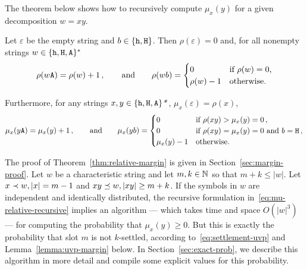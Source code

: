 
The theorem below shows how to recursively compute $\mu_x(y)$ 
for a given decomposition $w = xy$.


\begin{theorem}\label{thm:relative-margin}
  Let $\varepsilon$ be the empty string 
  and $b \in \{\mathtt{h}, \mathtt{H}\}$. 
  Then $\rho(\varepsilon) = 0$ 
  and, for all nonempty strings $w \in \{\mathtt{h}, \mathtt{H}, \mathtt{A}\}^*$ 
  \begin{equation}
    \rho(w\mathtt{A}) = \rho(w) + 1\,, \qquad\text{and}\qquad
    \rho(wb) = \begin{cases} 0 & \text{if $\rho(w) = 0$,}\\
      \rho(w)-1 & \text{otherwise.}
    \end{cases}
    \label{eq:rho-recursive}
  \end{equation}


  Furthermore, for any strings $x, y \in\{\mathtt{h}, \mathtt{H}, \mathtt{A}\}\text{\emph{*}}$,
  $\mu_x(\varepsilon) =\rho(x)$, 
  \begin{equation}
    \mu_x(y\mathtt{A})= \mu_x(y)+1\,,\qquad\text{and}\qquad
    \mu_x(yb)= \begin{cases}
      0 & \text{if $\rho(xy) > \mu_x(y)=0$}\,, \\
      0 & \text{if $\rho(xy) = \mu_x(y) = 0$ and $b = \mathtt{H}$}\,, \\
      \mu_x(y)-1 & \text{otherwise.}
    \end{cases}
    \label{eq:mu-relative-recursive}
  \end{equation}

\end{theorem}
The proof of Theorem~\ref{thm:relative-margin} is given in Section~\ref{sec:margin-proof}. 
Let $w$ be a characteristic string and 
let $m, k \in \mathbb{N}$ so that $m + k \leq |w|$. 
Let $x \prec w, |x| = m-1$ and $xy \preceq w, |xy| \geq m + k$.
If the symbols in $w$ are independent and identically distributed, 
the recursive formulation in~\eqref{eq:mu-relative-recursive} implies an algorithm --- which takes time and space $O(|w|^3)$ --- 
for computing the probability that $\mu_x(y) \geq 0$. 
But this is exactly the probability that slot $m$ is not $k$-settled, 
according to~\eqref{eq:settlement-uvp} 
and Lemma~\ref{lemma:uvp-margin} below. 
In Section~\ref{sec:exact-prob}, 
we describe this algorithm in more detail and 
compile some explicit values for this probability.




